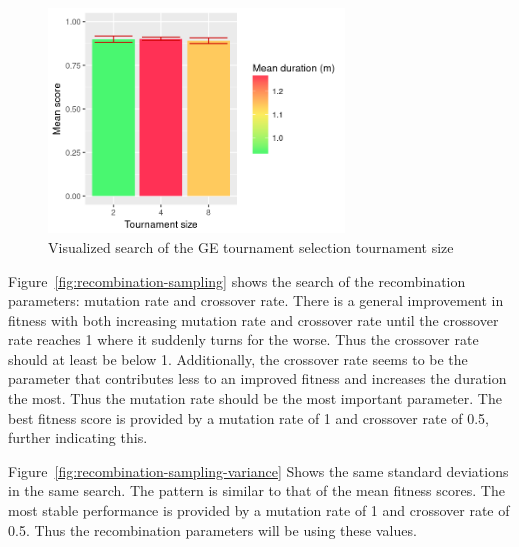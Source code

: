 \begin{figure}
    \centering
    \includegraphics[width=0.7\textwidth]{figures/ge-tournament-sampling}
    \caption{Visualized search of the GE tournament selection tournament size}
    \label{fig:tournament-sampling}
\end{figure}

Figure~\ref{fig:recombination-sampling} shows the search of the recombination parameters: mutation rate and crossover rate.
There is a general improvement in fitness with both increasing mutation rate and crossover rate until the crossover rate reaches 1 where it suddenly turns for the worse.
Thus the crossover rate should at least be below 1.
Additionally, the crossover rate seems to be the parameter that contributes less to an improved fitness and increases the duration the most.
Thus the mutation rate should be the most important parameter.
The best fitness score is provided by a mutation rate of 1 and crossover rate of 0.5, further indicating this.

Figure~\ref{fig:recombination-sampling-variance} Shows the same standard deviations in the same search.
The pattern is similar to that of the mean fitness scores.
The most stable performance is provided by a mutation rate of 1 and crossover rate of 0.5.
Thus the recombination parameters will be using these values.

